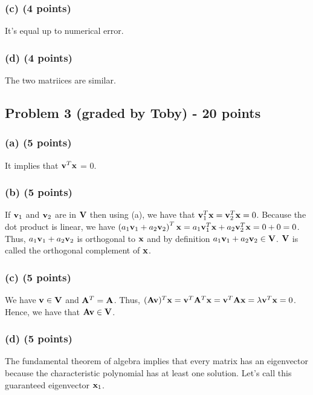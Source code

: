 \documentclass[11pt]{article}
\begin{document}
\subsubsection*{(c) (4 points)}
It's equal up to numerical error.

\subsubsection*{(d) (4 points)}
The two matriices are similar. 


\newpage

\subsection*{Problem 3 (graded by Toby) - 20 points}

\subsubsection*{(a) (5 points)}

It implies that $\mathbf{v}^T\mathbf{x}$ = 0.

\subsubsection*{(b) (5 points)}

If $\mathbf{v}_1$ and $\mathbf{v}_2$ are in $\mathbf{V}$ then using (a), we have that $\mathbf{v}_1^T\mathbf{x} = \mathbf{v}_2^T\mathbf{x} = 0$. Because the dot product is linear, we have $\left(a_1\mathbf{v}_1 + a_2 \mathbf{v}_2 \right)^T \mathbf{x} = a_1\mathbf{v}_1^T\mathbf{x} + a_2 \mathbf{v}_2^T\mathbf{x} = 0 + 0 = 0$. Thus, $a_1\mathbf{v}_1 + a_2 \mathbf{v}_2$ is orthogonal to $\mathbf{x}$ and by definition $a_1\mathbf{v}_1 + a_2 \mathbf{v}_2 \in \mathbf{V}$. $\mathbf{V}$ is called the orthogonal complement of $\mathbf{x}$.

\subsubsection*{(c) (5 points)}

We have $\mathbf{v} \in \mathbf{V}$ and $\mathbf{A}^T=\mathbf{A}$. Thus, $(\mathbf{A}\mathbf{v})^T\mathbf{x} = \mathbf{v}^T\mathbf{A}^T\mathbf{x} = \mathbf{v}^T\mathbf{A}\mathbf{x} = \lambda \mathbf{v}^T\mathbf{x} = 0$. Hence, we have that $\mathbf{A}\mathbf{v} \in \mathbf{V}$.

\subsubsection*{(d) (5 points)}
The fundamental theorem of algebra implies that every matrix has an eigenvector because the characteristic polynomial has at least one solution. Let's call this guaranteed eigenvector $\mathbf{x}_1$. 
\end{document}
